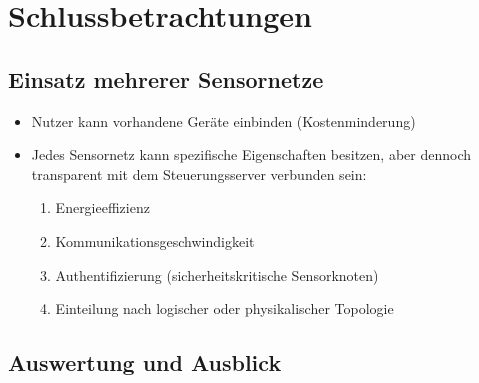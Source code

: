 \section[Fazit]{Schlussbetrachtungen}
\myContentSectionFrame


\subsection{Einsatz mehrerer Sensornetze}


\begin{frame}{\insertsubsection}{}
	\begin{itemize}
	\item 	Nutzer kann vorhandene Geräte einbinden (Kostenminderung)
	\end{itemize}

	\begin{itemize}
	\item 	Jedes Sensornetz kann spezifische Eigenschaften besitzen,
			aber dennoch transparent mit dem Steuerungsserver verbunden sein:
			\begin{enumerate}
			\item 	Energieeffizienz
			\item 	Kommunikationsgeschwindigkeit
			\item 	Authentifizierung (sicherheitskritische Sensorknoten)
			\item 	Einteilung nach logischer oder physikalischer Topologie
			\end{enumerate}
	\end{itemize}
\end{frame}



\subsection{Auswertung und Ausblick}


